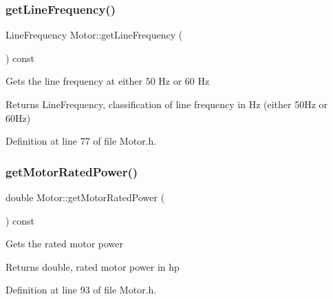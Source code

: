\mbox{\label{class_motor_a41e71462fe60674a5554e47d0079b0f3}} 
\subsubsection{\texorpdfstring{get\+Line\+Frequency()}{getLineFrequency()}}
{\footnotesize\ttfamily Line\+Frequency Motor\+::get\+Line\+Frequency (\begin{DoxyParamCaption}{ }\end{DoxyParamCaption}) const\hspace{0.3cm}{\ttfamily [inline]}}

Gets the line frequency at either 50 Hz or 60 Hz \begin{DoxyReturn}{Returns}
Line\+Frequency, classification of line frequency in Hz (either 50\+Hz or 60\+Hz) 
\end{DoxyReturn}


Definition at line 77 of file Motor.\+h.

\mbox{\label{class_motor_a476d3790492959945b3b75d1638f737f}} 
\subsubsection{\texorpdfstring{get\+Motor\+Rated\+Power()}{getMotorRatedPower()}}
{\footnotesize\ttfamily double Motor\+::get\+Motor\+Rated\+Power (\begin{DoxyParamCaption}{ }\end{DoxyParamCaption}) const\hspace{0.3cm}{\ttfamily [inline]}}

Gets the rated motor power \begin{DoxyReturn}{Returns}
double, rated motor power in hp 
\end{DoxyReturn}


Definition at line 93 of file Motor.\+h.

\mbox{\label{class_motor_a3fedfc960a6970508b39999c58d44cc6}} 
